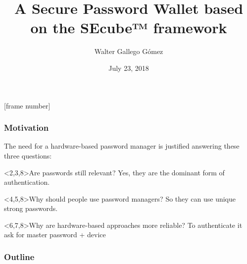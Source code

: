 \documentclass[14pt,usenames,dvipsnames]{beamer}
\title[About Beamer] %
{A Secure Password Wallet based on the SEcube™ framework}
\author %
{Walter Gallego Gómez}
\institute[VFU] %
{
 Department of control and computer engineering\\
Politecnico di Torino
}
\date[VLC 2014] %
{July 23, 2018}
\begin{document}
[frame number]{}


\frame{\titlepage}


\begin{frame}
\frametitle{Motivation}
The need for a hardware-based password manager is justified answering these three questions:


\begin{block}<2,3,8>{Are passwords still relevant?}
 {Yes, they are the dominant form of authentication.}
\end{block}

\begin{block}<4,5,8>{Why should people use password managers?}
 {So they can use unique strong passwords.}
\end{block}

\begin{block}<6,7,8>{Why are hardware-based approaches more reliable?}
 {To authenticate it ask for master password + device}
\end{block}

%    
%
%    
%
%

\end{frame}



\begin{frame}
\frametitle{Outline}
\tableofcontents
\end{frame}
\end{document}
